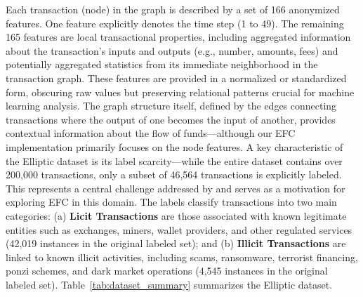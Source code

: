 \documentclass[12pt]{article}
\begin{document}
Each transaction (node) in the graph is described by a set of 166 anonymized features. One feature explicitly denotes the
time step (1 to 49). The remaining 165 features are local transactional properties, including aggregated information about
the transaction's inputs and outputs (e.g., number, amounts, fees) and potentially aggregated statistics from its immediate
neighborhood in the transaction graph. These features are provided in a normalized or standardized form, obscuring raw
values but preserving relational patterns crucial for machine learning analysis. The graph structure itself, defined by
the edges connecting transactions where the output of one becomes the input of another, provides contextual information
about the flow of funds---although our EFC implementation primarily focuses on the node features. A key characteristic of
the Elliptic dataset is its label scarcity---while the entire dataset contains over 200,000 transactions, only a subset
of 46,564 transactions is explicitly labeled. This represents a central challenge addressed by  \cite{lorenz2021machinelearningmethodsdetect}
and serves as a motivation for exploring EFC in this domain.   The labels classify transactions into two main categories:
(a) {\bf Licit Transactions} are those associated with known legitimate entities such as exchanges, miners, wallet providers,
and other regulated services (42,019 instances in the original labeled set); and (b) {\bf Illicit Transactions} are linked
to known illicit activities, including scams, ransomware, terrorist financing, ponzi schemes, and dark market operations
(4,545 instances in the original labeled set). Table~\ref{tab:dataset_summary} summarizes the Elliptic dataset.

\end{document}
